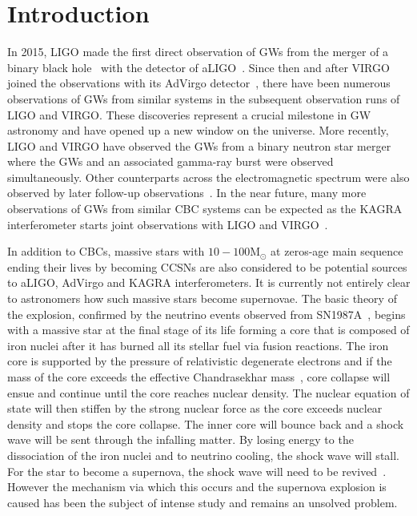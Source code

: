 \documentclass[aps,twocolumn,showpacs,groupedaddress, nofootinbib]{revtex4}  %
\begin{document}
\section{Introduction}
%
%
In 2015, LIGO made the first direct observation of \acp{GW} from the
merger of a binary black hole~\cite{abbott2016observation} 
with the detector of \ac{aLIGO}~\cite{aasi2015advanced}.
Since then and after VIRGO joined the observations 
with its \ac{AdVirgo} detector~\cite{abbott2016gw151226,
abbott2017gw170608, abbott2017gw170814}, there have been
numerous observations of \acp{GW} from similar systems in the subsequent
observation runs of LIGO and VIRGO. These discoveries represent a crucial
milestone in \ac{GW} astronomy and have opened up a new window on the universe.
More recently, LIGO and VIRGO have observed the \acp{GW} from a binary neutron
star merger~\cite{abbott2017gw170817, abbott2017gravitational, abbott2017multi}
where the \acp{GW} and an associated gamma-ray burst were observed
simultaneously. Other counterparts across the electromagnetic spectrum were
also observed by later follow-up observations~\cite{abbott2017multi}. In the
near future, many more observations of \acp{GW} from similar \ac{CBC} systems
can be expected as the KAGRA interferometer starts joint observations with LIGO and
VIRGO~\cite{aso2013interferometer, somiya2012detector, abbott2018prospects, gossan2016observing,
abbott2016first, abbott2019optically}.

%
%
In addition to \acp{CBC}, massive stars with $10-100 \text{M}_\odot $ at
zeros-age main sequence ending their lives by becoming 
\acp{CCSN} are also considered to be potential sources to
\ac{aLIGO}, \ac{AdVirgo} and KAGRA interferometers. 
It is currently not entirely clear to astronomers how such
massive stars become supernovae. The basic theory of the explosion, confirmed
by the neutrino events observed from SN1987A~\cite{sato1987analysis}, begins
with a massive star at the final stage of its life forming a core that is
composed of iron nuclei after it has burned all its stellar fuel via fusion
reactions. The iron core is supported by the pressure of relativistic
degenerate electrons and if the mass of the core exceeds the effective
Chandrasekhar mass~\cite{baron1990effect, bethe1990supernova}, core collapse
will ensue and continue until the core reaches nuclear density. The nuclear
equation of state will then stiffen by the strong nuclear force as the core exceeds
nuclear density and stops the core collapse. The inner core will bounce back
and a shock wave will be sent through the infalling matter.  By losing energy
to the dissociation of the iron nuclei and to neutrino cooling, the shock wave
will stall. For the star to become a supernova, the shock wave will need to be
revived~\cite{o2011black}. However the mechanism via which this occurs and the
supernova explosion is caused has been the subject of intense study and remains
an unsolved problem.
\end{document}
